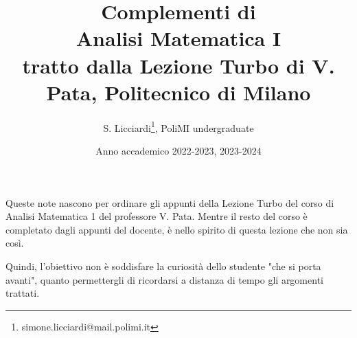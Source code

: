 \documentclass[a4paper,12pt]{report}
\author{S. Licciardi\thanks{simone.licciardi@mail.polimi.it}, PoliMI undergraduate}
\date{\large Anno accademico 2022-2023, 2023-2024}
\title
{
	\large Complementi di\\
	\LARGE \textbf{Analisi Matematica I} \\[.4\baselineskip]
	\large tratto dalla Lezione Turbo di V. Pata, Politecnico di Milano
}
\begin{document}
\maketitle
\tableofcontents

\par\vspace{2cm}Queste note nascono per ordinare gli appunti della Lezione Turbo del corso di Analisi Matematica 1 del professore V. Pata. Mentre il resto del corso è completato dagli appunti del docente, è nello spirito di questa lezione che non sia così.

Quindi, l'obiettivo non è soddisfare la curiosità dello studente "che si porta avanti", quanto permettergli di ricordarsi a distanza di tempo gli argomenti trattati.

\newpage






\end{document}
